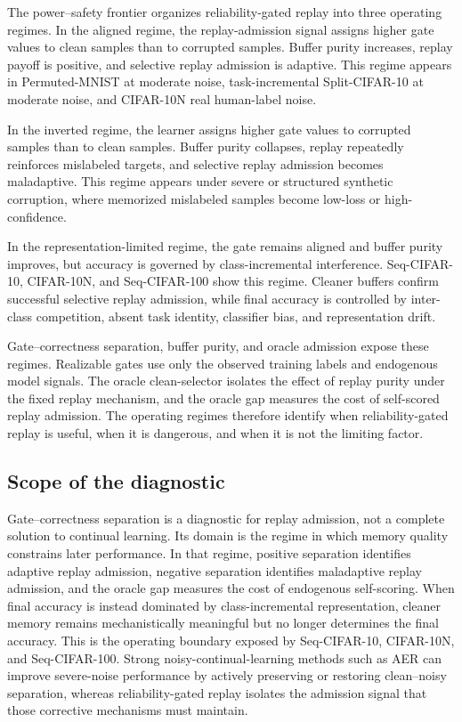\documentclass[preprint,12pt]{elsarticle}
\begin{document}
The power--safety frontier organizes reliability-gated replay into three operating regimes. In the aligned regime, the replay-admission signal assigns higher gate values to clean samples than to corrupted samples. Buffer purity increases, replay payoff is positive, and selective replay admission is adaptive. This regime appears in Permuted-MNIST at moderate noise, task-incremental Split-CIFAR-10 at moderate noise, and CIFAR-10N real human-label noise.

In the inverted regime, the learner assigns higher gate values to corrupted samples than to clean samples. Buffer purity collapses, replay repeatedly reinforces mislabeled targets, and selective replay admission becomes maladaptive. This regime appears under severe or structured synthetic corruption, where memorized mislabeled samples become low-loss or high-confidence.

In the representation-limited regime, the gate remains aligned and buffer purity improves, but accuracy is governed by class-incremental interference. Seq-CIFAR-10, CIFAR-10N, and Seq-CIFAR-100 show this regime. Cleaner buffers confirm successful selective replay admission, while final accuracy is controlled by inter-class competition, absent task identity, classifier bias, and representation drift.

Gate--correctness separation, buffer purity, and oracle admission expose these regimes. Realizable gates use only the observed training labels and endogenous model signals. The oracle clean-selector isolates the effect of replay purity under the fixed replay mechanism, and the oracle gap measures the cost of self-scored replay admission. The operating regimes therefore identify when reliability-gated replay is useful, when it is dangerous, and when it is not the limiting factor.

\subsection{Scope of the diagnostic}

Gate--correctness separation is a diagnostic for replay admission, not a complete solution to continual learning. Its domain is the regime in which memory quality constrains later performance. In that regime, positive separation identifies adaptive replay admission, negative separation identifies maladaptive replay admission, and the oracle gap measures the cost of endogenous self-scoring. When final accuracy is instead dominated by class-incremental representation, cleaner memory remains mechanistically meaningful but no longer determines the final accuracy. This is the operating boundary exposed by Seq-CIFAR-10, CIFAR-10N, and Seq-CIFAR-100. Strong noisy-continual-learning methods such as AER can improve severe-noise performance by actively preserving or restoring clean--noisy separation, whereas reliability-gated replay isolates the admission signal that those corrective mechanisms must maintain.
\end{document}
